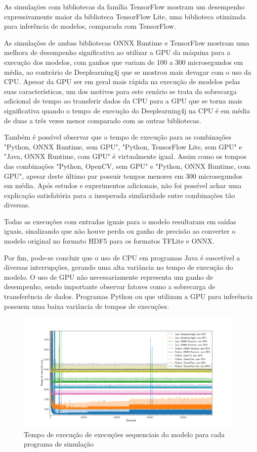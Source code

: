 As simulações com bibliotecas da família TensorFlow mostram um desempenho expressivamente maior da biblioteca TensorFlow Lite, uma biblioteca otimizada para inferência de modelos, comparada com TensorFlow.

As simulações de ambas bibliotecas ONNX Runtime e TensorFlow mostram uma melhora de desempenho significativa ao utilizar a GPU da máquina para a execução dos modelos, com ganhos que variam de 100 a 300 microsegundos em média, ao contrário de Deeplearning4j que se mostrou mais devagar com o uso da CPU. Apesar da GPU ser em geral mais rápida na execução de modelos pelas suas características, um dos motivos para este cenário se trata da sobrecarga adicional de tempo ao transferir dados da CPU para a GPU que se torna mais significativa quando o tempo de execução do Deeplearning4j na CPU é em média de duas a três vezes menor comparado com as outras bibliotecas.

Também é possível observar que o tempo de execução para as combinações "Python, ONNX Runtime, sem GPU", "Python, TensorFlow Lite, sem GPU" e "Java, ONNX Runtime, com GPU" é virtualmente igual. Assim como os tempos das combinações "Python, OpenCV, sem GPU" e "Python, ONNX Runtime, com GPU", apesar deste último par possuir tempos menores em 300 microsegundos em média. Após estudos e experimentos adicionais, não foi possível achar uma explicação satisfatória para a inesperada similaridade entre combinações tão diversas.

Todas as execuções com entradas iguais para o modelo resultaram em saídas iguais, sinalizando que não houve perda ou ganho de precisão ao converter o modelo original no formato HDF5 para os formatos TFLite e ONNX.

Por fim, pode-se concluir que o uso de CPU em programas Java é suscetível a diversas interrupções, gerando uma alta variância no tempo de execução do modelo. O uso de GPU não necessariamente representa um ganho de desempenho, sendo importante observar fatores como a sobrecarga de transferência de dados. Programas Python ou que utilizam a GPU para inferência possuem uma baixa variância de tempos de execuções.

\begin{figure}[h]
  \centerline{\includegraphics[width=\paperwidth]{img/all.pdf}}
  \caption{Tempo de execução de execuções sequenciais do modelo para cada programa de simulação}
  \label{fig:all}
\end{figure}